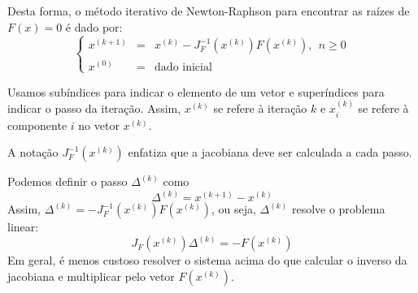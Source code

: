 Desta forma, o método iterativo de Newton-Raphson para encontrar as raízes de $F(x)=0$ é dado por:
\begin{equation*}
\left\{\begin{array}{rcl}
x^{(k+1)} &=& x^{(k)}-J_F^{-1}\left(x^{(k)}\right)F(x^{(k)}),~~ n\geq 0\\
x^{(0)}&=&\text{dado inicial}
\end{array}\right.  
\end{equation*}

\begin{obs} Usamos subíndices para indicar o elemento de um vetor e superíndices para indicar o passo da iteração. Assim, $x^{(k)}$ se refere à iteração $k$ e $x_i^{(k)}$ se refere à componente $i$ no vetor $x^{(k)}$.
\end{obs}
\begin{obs} A notação $J_F^{-1}\left(x^{(k)}\right)$ enfatiza que a jacobiana deve ser calculada a cada passo.
\end{obs}
\begin{obs} Podemos definir o passo $\Delta^{(k)}$ como
$$\Delta^{(k)}= x^{(k+1)}-x^{(k)}$$
Assim, $\Delta^{(k)}=-J_F^{-1}\left(x^{(k)}\right)F(x^{(k)})$, ou seja, $\Delta^{(k)}$ resolve o problema linear:
$$J_F\left(x^{(k)}\right)\Delta^{(k)}= - F(x^{(k)})$$
Em geral, é menos custoso resolver o sistema acima do que calcular o inverso da jacobiana e multiplicar pelo vetor $F(x^{(k)})$.
\end{obs}

